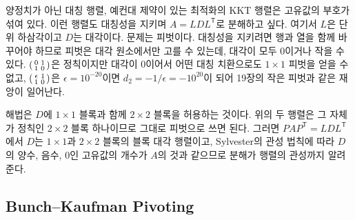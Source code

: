 양정치가 아닌 대칭 행렬, 예컨대 제약이 있는 최적화의 KKT 행렬은 고유값의 부호가 섞여 있다. 이런 행렬도 대칭성을 지키며 $A=LDL^{\mathsf T}$로 분해하고 싶다. 여기서 $L$은 단위 하삼각이고 $D$는 대각이다. 문제는 피벗이다. 대칭성을 지키려면 행과 열을 함께 바꾸어야 하므로 피벗은 대각 원소에서만 고를 수 있는데, 대각이 모두 $0$이거나 작을 수 있다. $\begin{psmallmatrix}0&1\\1&0\end{psmallmatrix}$은 정칙이지만 대각이 $0$이어서 어떤 대칭 치환으로도 $1\times1$ 피벗을 얻을 수 없고, $\begin{psmallmatrix}\epsilon&1\\1&0\end{psmallmatrix}$은 $\epsilon=10^{-20}$이면 $d_2=-1/\epsilon=-10^{20}$이 되어 19장의 작은 피벗과 같은 재앙이 일어난다.

해법은 $D$에 $1\times1$ 블록과 함께 $2\times2$ 블록을 허용하는 것이다\cite{bunch1971parlett}. 위의 두 행렬은 그 자체가 정칙인 $2\times2$ 블록 하나이므로 그대로 피벗으로 쓰면 된다. 그러면 $PAP^{\mathsf T}=LDL^{\mathsf T}$에서 $D$는 $1\times1$과 $2\times2$ 블록의 블록 대각 행렬이고, Sylvester의 관성 법칙에 따라 $D$의 양수, 음수, $0$인 고유값의 개수가 $A$의 것과 같으므로 분해가 행렬의 관성까지 알려 준다.

\subsection{Bunch--Kaufman Pivoting}

